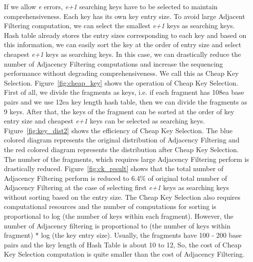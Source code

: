 If we allow \textit{e} errors, \textit{e+1} searching keys have to be selected
to maintain comprehensiveness. Each key has its own key entry size. To avoid
large Adjacent Filtering computation, we can select the smallest \textit{e+1}
keys as searching keys. Hash table already stores the entry sizes corresponding
to each key and based on this information, we can easily sort the key at the
order of entry size and select cheapest \textit{e+1} keys as searching keys. In
this case, we can drastically reduce the number of Adjacency Filtering
computations and increase the sequencing performance without degrading
comprehensiveness. We call this as Cheap Key Selection.
Figure~\ref{fig:cheap_key} shows the operation of Cheap Key Selection. First of
all, we divide the fragments as keys, i.e. if each fragment has 108ea base
pairs and we use 12ea key length hash table, then we can divide the fragments
as 9 keys. After that, the keys of the fragment can be sorted at the order of
key entry size and cheapest \textit{e+1} keys can be selected as searching
keys. Figure~\ref{fig:key_dist2} shows the efficiency of Cheap Key Selection.
The blue colored diagram represents the original distribution of Adjacency
Filtering and the red colored diagram represents the distribution after Cheap
Key Selection. The number of the fragments, which requires large Adjacency
Filtering perform is drastically reduced. Figure~\ref{fig:ck_result} shows that
the total number of Adjacency Filtering perform is reduced to 6.4\% of original
total number of Adjacency Filtering at the case of selecting first \textit{e+1}
keys as searching keys without sorting based on the entry size. The Cheap Key
Selection also requires computational resources and the number of computations
for sorting is proportional to log (the number of keys within each fragment).
However, the number of Adjacency filtering is proportional to (the number of
keys within fragment) * log (the key entry size). Usually, the fragments have
100 - 200 base pairs and the key length of Hash Table is about 10 to 12, So, the
cost of Cheap Key Selection computation is quite smaller than the cost of
Adjacency Filtering. 
